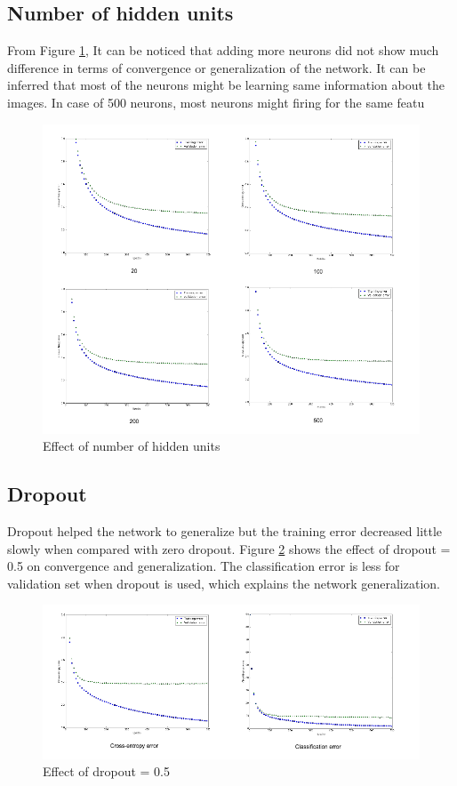\documentclass{article}
\begin{document}
\subsection{Number of hidden units}

From Figure \ref{fig:5e}, It can be noticed that adding more neurons did not show much difference in terms of convergence or generalization of the network. It can be inferred that most of the neurons might be learning same information about the images. In case of 500 neurons, most neurons might firing for the same featu

\begin{figure}[!h]
  \centering
  \includegraphics[width=\textwidth]{figures/5e}
  \caption{Effect of number of hidden units}
  \label{fig:5e}
\end{figure}


\subsection{Dropout}
Dropout helped the network to generalize but the training error decreased little slowly when compared with zero dropout. Figure \ref{fig:5f} shows the effect of dropout = 0.5 on convergence and generalization. The classification error is less for validation set when dropout is used, which explains the network generalization.


\begin{figure}[!h]
  \centering
  \includegraphics[width=\textwidth]{figures/5f}
  \caption{Effect of dropout = 0.5}
  \label{fig:5f}
\end{figure}
\end{document}

